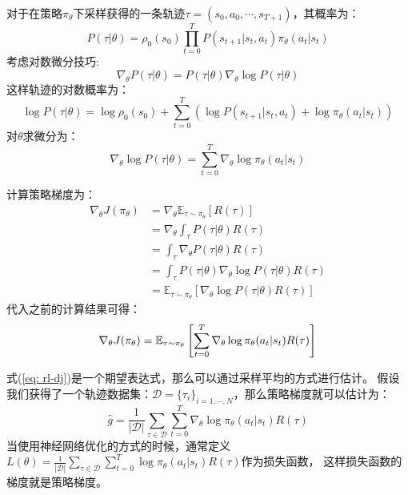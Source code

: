 对于在策略$\pi_\theta$下采样获得的一条轨迹$\tau = (s_0, a_0, \cdots, s_{T+1})$，其概率为：
\begin{equation*}
    P(\tau|\theta) = \rho_0(s_0) \prod_{t=0}^{T} P(s_{t+1}|s_t, a_t)\pi_\theta(a_t|s_t)
\end{equation*}
考虑对数微分技巧:
\begin{equation*}
    \nabla_\theta P(\tau|\theta) = P(\tau|\theta)\nabla_\theta \log P(\tau|\theta)
\end{equation*}
这样轨迹的对数概率为：
\begin{equation*}
    \log P(\tau|\theta) = \log \rho_0(s_0) + \sum_{t=0}^T \left( \log P(s_{t+1}|s_t,a_t) + \log \pi_\theta (a_t|s_t) \right) 
\end{equation*}
对$\theta$求微分为：
\begin{equation*}
    \nabla_\theta \log P(\tau|\theta) = \sum_{t=0}^T \nabla_\theta \log \pi_\theta(a_t|s_t)
\end{equation*}

计算策略梯度为：
\begin{align*}
    \nabla_\theta J(\pi_\theta) &= \nabla_\theta \mathbb{E}_{\tau\sim\pi_\theta}[R(\tau)] \\
    &= \nabla_\theta \int_\tau P(\tau|\theta)R(\tau) \\
    &= \int_\tau \nabla_\theta P(\tau|\theta)R(\tau) \\
    &= \int_\tau P(\tau|\theta) \nabla_\theta \log P(\tau|\theta)R(\tau) \\
    &= \mathbb{E}_{\tau\sim\pi_\theta}\left[\nabla_\theta \log P(\tau|\theta)R(\tau)\right]
\end{align*}
代入之前的计算结果可得：
\begin{equation}{\label{eq: rl-dj}}
    \nabla_\theta J(\pi_\theta) = \mathbb{E}_{\tau\sim\pi_\theta} \left[ \sum_{t=0}^{T} \nabla_\theta \log \pi_\theta(a_t|s_t) R(\tau) \right]
\end{equation}

式(\ref{eq: rl-dj})是一个期望表达式，那么可以通过采样平均的方式进行估计。
假设我们获得了一个轨迹数据集：$\mathcal{D}=\{\tau_i\}_{i=1,\cdots,N}$，那么策略梯度就可以估计为：
\begin{equation*}
    \hat{g} = \frac{1}{|\mathcal{D}|}\sum_{\tau\in\mathcal{D}}\sum_{t=0}^T \nabla_\theta \log \pi_\theta(a_t|s_t)R(\tau)
\end{equation*}
当使用神经网络优化的方式的时候，通常定义$L(\theta) =\frac{1}{|\mathcal{D}|} \sum_{\tau\in\mathcal{D}}\sum_{t=0}^T \log \pi_\theta(a_t|s_t)R(\tau)$作为损失函数，
这样损失函数的梯度就是策略梯度。

